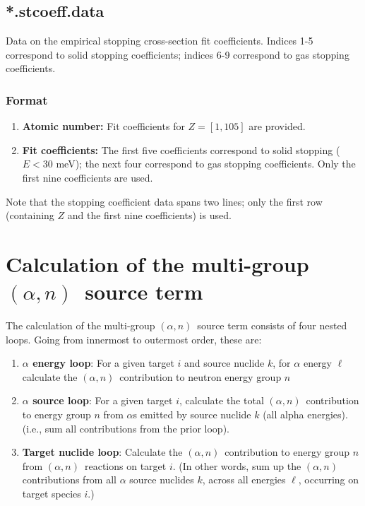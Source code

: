 \documentclass[10pt]{article}
\newcommand{\alphn}[0]{$\left(\alpha,n\right)$}
\begin{document}
\subsection{*.stcoeff.data}

Data on the empirical stopping cross-section fit coefficients. Indices 1-5 correspond to solid stopping coefficients; indices 6-9 correspond to gas stopping coefficients.\\

\subsubsection{Format}
\begin{enumerate}
\item \textbf{Atomic number:} Fit coefficients for $Z=\left[1,105\right]$ are provided.
\item \textbf{Fit coefficients:} The first five coefficients correspond to solid stopping ($E<30$ meV); the next four correspond to gas stopping coefficients. Only the first nine coefficients are used. 
\end{enumerate}

Note that the stopping coefficient data spans two lines; only the first row (containing $Z$ and the first nine coefficients) is used.

\clearpage
\section{Calculation of the multi-group \alphn\ source term}
The calculation of the multi-group \alphn\ source term consists of four nested loops. Going from innermost to outermost order, these are:

\begin{enumerate}
\item \textbf{$\alpha$ energy loop}: For a given target $i$ and source nuclide $k$, for $\alpha$ energy $\ell$ calculate the \alphn\ contribution to neutron energy group $n$
\item \textbf{$\alpha$ source loop}: For a given target $i$, calculate the total \alphn\ contribution to energy group $n$ from $\alpha$s emitted by source nuclide $k$ (all alpha energies). (i.e., sum all contributions from the prior loop).
\item \textbf{Target nuclide loop}: Calculate the \alphn\ contribution to energy group $n$ from \alphn\ reactions on target $i$. (In other words, sum up the \alphn contributions from all $\alpha$ source nuclides $k$, across all energies $\ell$, occurring on target species $i$.)
\end{enumerate}
\end{document}
